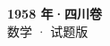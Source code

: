 \documentclass[zihao=-4, a4paper]{ctexart}
\begin{document}
\begin{center}
  {\Large\bfseries 1958 年·四川卷}\\[4pt]
  {\large 数学 · 试题版}
\end{center}
\medskip
{}

\end{document}
